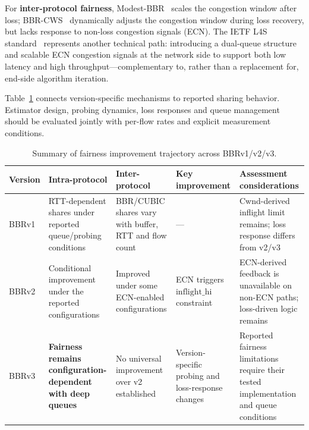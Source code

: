 \documentclass[a4paper,fleqn]{cas-sc}
\begin{document}
For \textbf{inter-protocol fairness}, Modest-BBR~\citep{zhang2018modest} scales
the congestion window after loss; BBR-CWS~\citep{song2020bbrcws} dynamically
adjusts the congestion window during loss recovery, but lacks response to
non-loss congestion signals (ECN). The IETF L4S standard~\citep{rfc9330}
represents another technical path: introducing a dual-queue structure and scalable
ECN congestion signals at the network side to support both low latency and high
throughput---complementary to, rather than a replacement for, end-side algorithm
iteration.

Table~\ref{tab:fairness_versions} connects version-specific mechanisms
to reported sharing behavior.
Estimator design, probing dynamics, loss responses and queue management
should be evaluated jointly with per-flow rates and explicit measurement
conditions.

\begin{table}[pos=htbp]
  \caption{Summary of fairness improvement trajectory across BBRv1/v2/v3.}
  \label{tab:fairness_versions}
  \small
  \begin{tabularx}{\tblwidth}{@{}p{1.0cm}p{2.3cm}p{2.3cm}p{2.0cm}X@{}}
    \toprule
    \textbf{Version} & \textbf{Intra-protocol} & \textbf{Inter-protocol}
      & \textbf{Key improvement} & \textbf{Assessment considerations} \\
    \midrule
    BBRv1 & RTT-dependent shares under reported queue/probing conditions &
      BBR/CUBIC shares vary with buffer, RTT and flow count & --- &
      Cwnd-derived inflight limit remains; loss response differs from v2/v3 \\
    \midrule
    BBRv2 & Conditional improvement under the reported configurations &
      Improved under some ECN-enabled configurations &
      ECN triggers $\mathrm{inflight\_hi}$ constraint &
      ECN-derived feedback is unavailable on non-ECN paths; loss-driven logic remains \\
    \midrule
    BBRv3 & \textbf{Fairness remains configuration-dependent with deep queues} &
      No universal improvement over v2 established &
      Version-specific probing and loss-response changes &
      Reported fairness limitations require their tested implementation and queue conditions \\
    \bottomrule
  \end{tabularx}
\end{table}

\FloatBarrier

\end{document}
